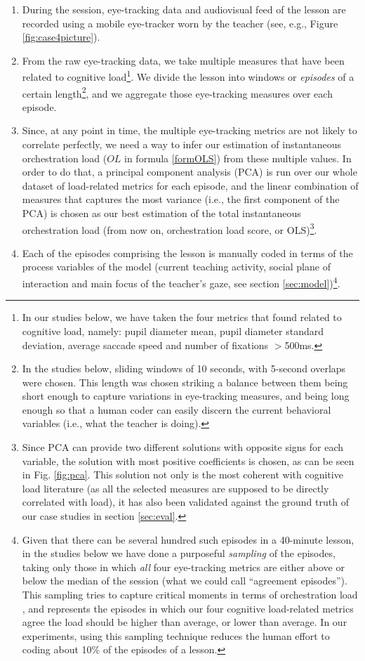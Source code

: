 \documentclass[10pt,journal,compsoc]{IEEEtran}
\begin{document}
\begin{enumerate}
\item During the session, eye-tracking data and audiovisual feed of the lesson are recorded using a mobile eye-tracker worn by the teacher (see, e.g., Figure \ref{fig:case4picture}).
\item From the raw eye-tracking data, we take multiple measures that have been related to cognitive load\footnote{In our studies below, we have taken the four metrics that \cite{Buettner2013} found related to cognitive load, namely: pupil diameter mean, pupil diameter standard deviation, average saccade speed and number of fixations $>$500ms.}. We divide the lesson into windows or \textit{episodes} of a certain length\footnote{In the studies below, sliding windows of 10 seconds, with 5-second overlaps were chosen. This length was chosen striking a balance between them being short enough to capture variations in eye-tracking measures, and being long enough so that a human coder can easily discern the current behavioral variables (i.e., what the teacher is doing).}, and we aggregate those eye-tracking measures over each episode.
\item Since, at any point in time, the multiple eye-tracking metrics are not likely to correlate perfectly, we need a way to infer our estimation of instantaneous orchestration load ($OL$ in formula \ref{formOLS}) from these multiple values. In order to do that, a principal component analysis (PCA) is run over our whole dataset of load-related metrics for each episode, and the linear combination of measures that captures the most variance (i.e., the first component of the PCA) is chosen as our best estimation of the total instantaneous orchestration load (from now on, orchestration load score, or OLS)\footnote{Since PCA can provide two different solutions with opposite signs for each variable, the solution with most positive coefficients is chosen, as can be seen in Fig. \ref{fig:pca}. This solution not only is the most coherent with cognitive load literature (as all the selected measures are supposed to be directly correlated with load), it has also been validated against the ground truth of our case studies in section \ref{sec:eval}.}.
\item Each of the episodes comprising the lesson is manually coded in terms of the process variables of the model (current teaching activity, social plane of interaction and main focus of the teacher's gaze, see section \ref{sec:model})\footnote{Given that there can be several hundred such episodes in a 40-minute lesson, in the studies below we have done a purposeful \textit{sampling} of the episodes, taking only those in which \textit{all} four eye-tracking metrics are either above or below the median of the session (what we could call ``agreement episodes''). This sampling tries to capture critical moments in terms of orchestration load \cite{Prieto2014}, and represents the episodes in which our four cognitive load-related metrics agree the load should be higher than average, or lower than average. In our experiments, using this sampling technique reduces the human effort to coding about 10\% of the episodes of a lesson.}.

\end{enumerate}
\end{document}
